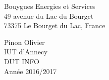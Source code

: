 \documentclass[a4paper]{article}
\begin{document}
    \pagestyle{fancy}
    \thispagestyle{empty}
    \noindent
    \begin{minipage}{.5\textwidth}
        Bouygues Energies et Services \\
        49 avenue du Lac du Bourget \\
        73375 Le Bourget du Lac, France
    \end{minipage}
    \begin{minipage}{.5\textwidth}
    \begin{flushright}
        Pinon Olivier \\
        IUT d'Annecy \\
        DUT INFO \\
        Année 2016/2017 \\
    \end{flushright}
    \end{minipage}
\end{document}
